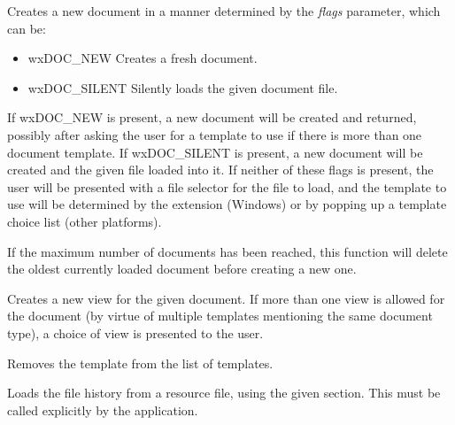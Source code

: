 

Creates a new document in a manner determined by the {\it flags} parameter, which can be:

\begin{itemize}\itemsep=0pt
\item wxDOC\_NEW Creates a fresh document.
\item wxDOC\_SILENT Silently loads the given document file.
\end{itemize}

If wxDOC\_NEW is present, a new document will be created and returned, possibly after
asking the user for a template to use if there is more than one document template.
If wxDOC\_SILENT is present, a new document will be created and the given file loaded
into it. If neither of these flags is present, the user will be presented with
a file selector for the file to load, and the template to use will be determined by the
extension (Windows) or by popping up a template choice list (other platforms).

If the maximum number of documents has been reached, this function
will delete the oldest currently loaded document before creating a new one.



Creates a new view for the given document. If more than one view is allowed for the
document (by virtue of multiple templates mentioning the same document type), a choice
of view is presented to the user.



Removes the template from the list of templates.



Loads the file history from a resource file, using the given section. This must be called
explicitly by the application.


